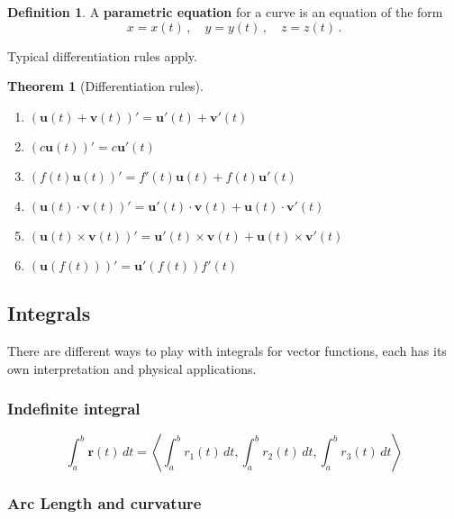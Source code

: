 \documentclass[
]{book}
\newtheorem{theorem}{Theorem}[chapter]
\theoremstyle{definition}
\newtheorem{definition}{Definition}[chapter]
\theoremstyle{definition}
\theoremstyle{definition}
\theoremstyle{definition}
\theoremstyle{remark}
\begin{document}
\begin{definition}
A \textbf{parametric equation} for a curve is an equation of the form
\[
x=x(t)\,, \quad  y = y(t)\,, \quad z = z(t) \,.
\]
\end{definition}

Typical differentiation rules apply.

\begin{theorem}[Differentiation rules]
\leavevmode

\begin{enumerate}
\def\labelenumi{\arabic{enumi}.}
\item
  \((\mathbf{u}(t) + \mathbf{v}(t))' = \mathbf{u}'(t) + \mathbf{v}'(t)\)
\item
  \((c \mathbf{u}(t))' = c \mathbf{u}'(t)\)
\item
  \((f(t) \mathbf{u}(t))' = f'(t) \mathbf{u}(t) + f(t) \mathbf{u}'(t)\)
\item
  \((\mathbf{u}(t) \cdot \mathbf{v}(t))' = \mathbf{u}'(t)\cdot \mathbf{v}(t) + \mathbf{u}(t)\cdot \mathbf{v}'(t)\)
\item
  \((\mathbf{u}(t) \times \mathbf{v}(t))' = \mathbf{u}'(t)\times \mathbf{v}(t) + \mathbf{u}(t)\times \mathbf{v}'(t)\)
\item
  \((\mathbf{u}(f(t)))' = \mathbf{u}'(f(t)) f'(t)\)
\end{enumerate}

\end{theorem}

\subsection{Integrals}\label{integrals}

There are different ways to play with integrals for vector functions,
each has its own interpretation and physical applications.

\subsubsection{Indefinite integral}\label{indefinite-integral}

\begin{equation*}
    \int_a^b \mathbf{r}(t) \, dt = \left\langle \int_a^b r_1(t) \, dt, \int_a^b r_2(t) \, dt, \int_a^b r_3(t) \, dt \right\rangle
\end{equation*}

\subsubsection{Arc Length and curvature}\label{arc-length-and-curvature}
\end{document}

